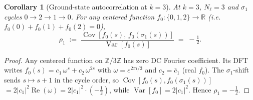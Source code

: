 \documentclass[11pt]{article}
\newtheorem{corollary}[theorem]{Corollary}
\theoremstyle{definition}
\begin{document}
\begin{corollary}[Ground-state autocorrelation at $k=3$]\label{cor:k3}
At $k=3$, $N_\ell = 3$ and $\sigma_1$ cycles $0 \to 2 \to 1 \to 0$.
For any centered function $f_0 \colon \{0,1,2\} \to \mathbb{R}$
(i.e.\ $f_0(0)+f_0(1)+f_0(2)=0$),
\[
  \rho_1 \;:=\;
  \frac{\operatorname{Cov}[f_0(s),\,f_0(\sigma_1(s))]}
       {\operatorname{Var}[f_0(s)]}
  \;=\; -\tfrac{1}{2}.
\]
\end{corollary}
\begin{proof}
Any centered function on $\mathbb{Z}/3\mathbb{Z}$ has zero DC Fourier coefficient.
Its DFT writes $f_0(s) = c_1\,\omega^s + c_2\,\omega^{2s}$ with $\omega = e^{2\pi i/3}$
and $c_2 = \bar c_1$ (real $f_0$). The $\sigma_1$-shift sends $s \mapsto s+1$
in the cycle order, so $\operatorname{Cov}[f_0(s), f_0(\sigma_1(s))]$
$= 2|c_1|^2 \operatorname{Re}(\omega) = 2|c_1|^2 \cdot (-\tfrac{1}{2})$,
while $\operatorname{Var}[f_0] = 2|c_1|^2$.  Hence $\rho_1 = -\tfrac{1}{2}$.
\end{proof}
\end{document}
